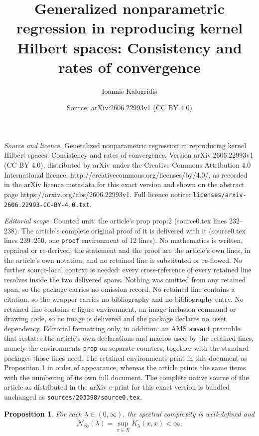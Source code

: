 \documentclass[10pt,a4paper]{amsart}
\title{Generalized nonparametric regression in reproducing kernel Hilbert spaces: Consistency and rates of convergence}
\author{Ioannis Kalogridis}
\date{Source: arXiv:2606.22993v1 (CC BY 4.0)}
\newtheorem{prop}{Proposition}
\begin{document}
\maketitle

\noindent\emph{Source and licence.} Generalized nonparametric regression in reproducing kernel Hilbert spaces: Consistency and rates of convergence. Version arXiv:2606.22993v1 (CC BY 4.0), distributed by arXiv under the Creative Commons Attribution 4.0 International licence, http://creativecommons.org/licenses/by/4.0/, as recorded in the arXiv licence metadata for this exact version and shown on the abstract page https://arxiv.org/abs/2606.22993v1. Full licence notice: \texttt{licenses/arxiv-2606.22993-CC-BY-4.0.txt}.\par\smallskip

\noindent\textit{Editorial scope.} Counted unit: the article's prop prop:2 (source0.tex lines 232--238). The article's complete original proof of it is delivered with it (source0.tex lines 239--250, one \texttt{proof} environment of 12 lines). No mathematics is written, repaired or re-derived: the statement and the proof are the article's own lines, in the article's own notation, and no retained line is substituted or re-flowed.  No further source-local context is needed: every cross-reference of every retained line resolves inside the two delivered spans.  Nothing was omitted from any retained span, so the package carries no omission record.  No retained line contains a citation, so the wrapper carries no bibliography and no bibliography entry.  No retained line contains a figure environment, an image-inclusion command or drawing code, so no image is delivered and the package declares no asset dependency.  Editorial formatting only, in addition: an AMS \texttt{amsart} preamble that restates the article's own declarations and macros used by the retained lines, namely the environments \texttt{prop} on separate counters, together with the standard packages those lines need.  The retained environments print in this document as Proposition 1 in order of appearance, whereas the article prints the same items with the numbering of its own full document.  The complete native source of the article as distributed in the arXiv e-print for this exact version is bundled unchanged as \texttt{sources/203398/source0.tex}.
\begin{prop}
\label{prop:2}
For each $\lambda \in (0,\infty)$, the spectral complexity is well-defined and
\begin{align*}
\mathcal{N}_{\infty}(\lambda) =  \sup_{x \in X} K_{\lambda}(x,x) < \infty.
\end{align*}
\end{prop}
\end{document}
